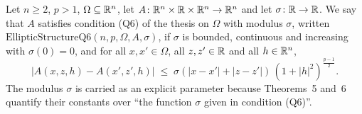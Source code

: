 \begin{definition}
Let $n\ge2$, $p>1$, $\Omega\subseteq\mathbb{R}^n$, let
$A\colon\mathbb{R}^n\times\mathbb{R}\times\mathbb{R}^n\to\mathbb{R}^n$ and let $\sigma\colon\mathbb{R}\to\mathbb{R}$.  We say
that $A$ satisfies condition (Q6) of the thesis on $\Omega$ with modulus $\sigma$,
written $\mathrm{EllipticStructureQ6}(n,p,\Omega,A,\sigma)$, if $\sigma$ is
bounded, continuous and increasing with $\sigma(0)=0$, and for all
$x,x'\in\Omega$, all $z,z'\in\mathbb{R}$ and all $h\in\mathbb{R}^n$,
\[
|A(x,z,h)-A(x',z',h)|\;\le\;\sigma(|x-x'|+|z-z'|)\,(1+|h|^2)^{\frac{p-1}2}.
\]
The modulus $\sigma$ is carried as an explicit parameter because Theorems~5
and~6 quantify their constants over ``the function $\sigma$ given in condition
(Q6)''.
\end{definition}
